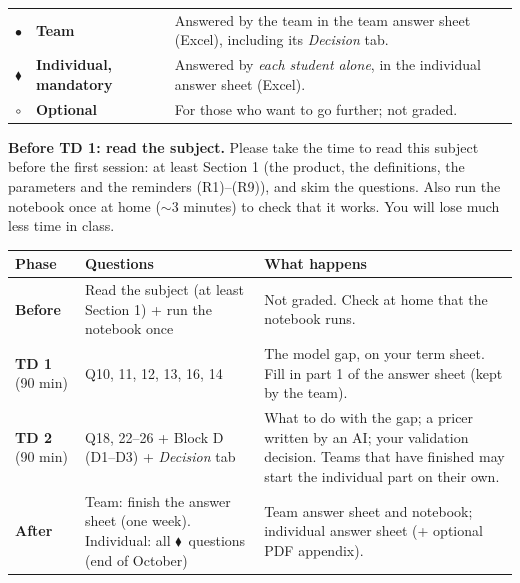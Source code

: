 \documentclass[11pt,a4paper]{article}
\newcommand{\team}{\textcolor{teamblue}{$\bullet$}}
\newcommand{\indiv}{\textcolor{indivred}{$\blacklozenge$}}
\newcommand{\opt}{$\circ$}
\begin{document}
\begin{center}
\small
\begin{tabular}{@{}c l p{6.2cm}@{}}
\toprule
\team  & \textbf{Team}                  & Answered by the team in the team answer sheet (Excel), including its \emph{Decision} tab. \\
\indiv & \textbf{Individual, mandatory} & Answered by \emph{each student alone}, in the individual answer sheet (Excel). \\
\opt   & \textbf{Optional}              & For those who want to go further; not graded. \\
\bottomrule
\end{tabular}
\end{center}

\noindent\textbf{Before TD 1: read the subject.} Please take the time to read this subject before the first session:
at least Section 1 (the product, the definitions, the parameters and the reminders (R1)--(R9)), and
skim the questions. Also run the notebook once at home ($\sim$3 minutes) to check that it works. You
will lose much less time in class.

\begin{center}
\small
\begin{tabularx}{\textwidth}{@{}l >{\raggedright\arraybackslash}X >{\raggedright\arraybackslash}X@{}}
\toprule
\textbf{Phase} & \textbf{Questions} & \textbf{What happens} \\
\midrule
\textbf{Before} & Read the subject (at least Section 1) + run the notebook once & Not graded. Check at home that the notebook runs. \\[0.4em]
\textbf{TD 1} (90 min) & Q10, 11, 12, 13, 16, 14 & The model gap, on your term sheet. Fill in part 1 of the answer sheet (kept by the team). \\[0.4em]
\textbf{TD 2} (90 min) & Q18, 22--26 + Block D (D1--D3) + \emph{Decision} tab & What to do with the gap; a pricer written by an AI; your validation decision. Teams that have finished may start the individual part on their own. \\[0.4em]
\textbf{After} & Team: finish the answer sheet (one week). Individual: all \indiv\ questions (end of October) & Team answer sheet and notebook; individual answer sheet (+ optional PDF appendix). \\
\bottomrule
\end{tabularx}
\end{center}
\end{document}

